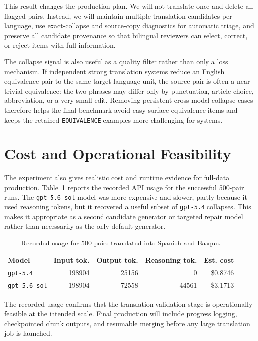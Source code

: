 \documentclass[10pt]{article}
\begin{document}
This result changes the production plan.  We will not translate once and delete
all flagged pairs.  Instead, we will maintain multiple translation candidates
per language, use exact-collapse and source-copy diagnostics for automatic
triage, and preserve all candidate provenance so that bilingual reviewers can
select, correct, or reject items with full information.

The collapse signal is also useful as a quality filter rather than only a loss
mechanism.  If independent strong translation systems reduce an English
equivalence pair to the same target-language unit, the source pair is often a
near-trivial equivalence: the two phrases may differ only by punctuation,
article choice, abbreviation, or a very small edit.  Removing persistent
cross-model collapse cases therefore helps the final benchmark avoid easy
surface-equivalence items and keeps the retained \texttt{EQUIVALENCE} examples
more challenging for systems.

\section{Cost and Operational Feasibility}

The experiment also gives realistic cost and runtime evidence for full-data
production.  Table~\ref{tab:cost} reports the recorded API usage for the
successful 500-pair runs.  The \texttt{gpt-5.6-sol} model was more expensive and
slower, partly because it used reasoning tokens, but it recovered a useful
subset of \texttt{gpt-5.4} collapses.  This makes it appropriate as a second
candidate generator or targeted repair model rather than necessarily as the only
default generator.

\begin{table}[h]
\centering
\small
\begin{tabular}{lrrrr}
\toprule
Model & Input tok. & Output tok. & Reasoning tok. & Est. cost \\
\midrule
\texttt{gpt-5.4} & 198904 & 25156 & 0 & \$0.8746 \\
\texttt{gpt-5.6-sol} & 198904 & 72558 & 44561 & \$3.1713 \\
\bottomrule
\end{tabular}
\caption{Recorded usage for 500 pairs translated into Spanish and Basque.}
\label{tab:cost}
\end{table}

The recorded usage confirms that the translation-validation stage is operationally
feasible at the intended scale.  Final production will include progress logging,
checkpointed chunk outputs, and resumable merging before any large translation
job is launched.
\end{document}
